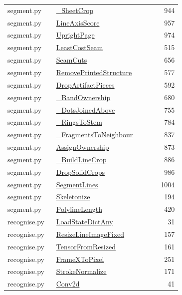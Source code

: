 \documentclass[11pt,a4paper,oneside]{report}
\begin{document}
\begin{longtable}{p{0.28\linewidth}p{0.48\linewidth}r}
segment.py & \hyperref[fn:segment:-SheetCrop]{\_SheetCrop} & 944\\
segment.py & \hyperref[fn:segment:LineAxisScore]{LineAxisScore} & 957\\
segment.py & \hyperref[fn:segment:UprightPage]{UprightPage} & 974\\
segment.py & \hyperref[fn:segment:LeastCostSeam]{LeastCostSeam} & 515\\
segment.py & \hyperref[fn:segment:SeamCuts]{SeamCuts} & 656\\
segment.py & \hyperref[fn:segment:RemovePrintedStructure]{RemovePrintedStructure} & 577\\
segment.py & \hyperref[fn:segment:DropArtifactPieces]{DropArtifactPieces} & 592\\
segment.py & \hyperref[fn:segment:-BandOwnership]{\_BandOwnership} & 680\\
segment.py & \hyperref[fn:segment:-DotsJoinedAbove]{\_DotsJoinedAbove} & 755\\
segment.py & \hyperref[fn:segment:-RingsToStem]{\_RingsToStem} & 784\\
segment.py & \hyperref[fn:segment:-FragmentsToNeighbour]{\_FragmentsToNeighbour} & 837\\
segment.py & \hyperref[fn:segment:AssignOwnership]{AssignOwnership} & 873\\
segment.py & \hyperref[fn:segment:-BuildLineCrop]{\_BuildLineCrop} & 886\\
segment.py & \hyperref[fn:segment:DropSolidCrops]{DropSolidCrops} & 986\\
segment.py & \hyperref[fn:segment:SegmentLines]{SegmentLines} & 1004\\
segment.py & \hyperref[fn:segment:Skeletonize]{Skeletonize} & 194\\
segment.py & \hyperref[fn:segment:PolylineLength]{PolylineLength} & 420\\
recognise.py & \hyperref[fn:recognise:LoadStateDictAny]{LoadStateDictAny} & 31\\
recognise.py & \hyperref[fn:recognise:ResizeLineImageFixed]{ResizeLineImageFixed} & 157\\
recognise.py & \hyperref[fn:recognise:TensorFromResized]{TensorFromResized} & 161\\
recognise.py & \hyperref[fn:recognise:FrameXToPixel]{FrameXToPixel} & 251\\
recognise.py & \hyperref[fn:recognise:StrokeNormalize]{StrokeNormalize} & 171\\
recognise.py & \hyperref[fn:recognise:Conv2d]{Conv2d} & 41\\

\end{longtable}
\end{document}
